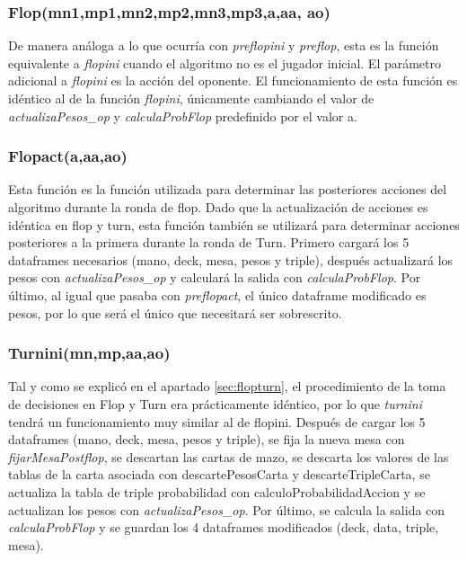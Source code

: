  
\subsubsection{Flop(mn1,mp1,mn2,mp2,mn3,mp3,a,aa, ao)}

De manera análoga a lo que ocurría con  \textit{preflopini} y \textit{ preflop}, esta es la función equivalente a  \textit{flopini} cuando el algoritmo no es el jugador inicial. El parámetro adicional a  \textit{flopini} es la acción del oponente.
El funcionamiento de esta función es idéntico al de la función  \textit{flopini}, únicamente cambiando el valor de \textit{ actualizaPesos\_op} y  \textit{calculaProbFlop} predefinido por el valor a.

\subsubsection{Flopact(a,aa,ao)}

Esta función es la función utilizada para determinar las posteriores acciones del algoritmo durante la ronda de flop. Dado que la actualización de acciones es idéntica en flop y turn, esta función también se utilizará para determinar acciones posteriores a la primera durante la ronda de Turn.
Primero cargará los 5 dataframes necesarios (mano, deck, mesa, pesos y triple), después actualizará los pesos  con  \textit{actualizaPesos\_op} y calculará la salida con  \textit{calculaProbFlop}. Por último, al igual que pasaba con  \textit{preflopact}, el único dataframe modificado es pesos, por lo que será el único que necesitará ser sobrescrito.


\subsubsection{Turnini(mn,mp,aa,ao)}

Tal y como se explicó en el apartado \ref{sec:flopturn}, el procedimiento de la toma de decisiones en Flop y Turn era prácticamente idéntico, por lo que  \textit{turnini} tendrá un funcionamiento muy similar al de flopini.
Después de cargar los 5 dataframes (mano, deck, mesa, pesos y triple), se fija la nueva mesa con  \textit{fijarMesaPostflop}, se descartan las cartas de mazo, se descarta los valores de las tablas de la carta asociada con descartePesosCarta y descarteTripleCarta, se actualiza la tabla de triple probabilidad con calculoProbabilidadAccion y se actualizan los pesos con  \textit{actualizaPesos\_op}.
Por último, se calcula la salida con  \textit{calculaProbFlop} y se guardan los 4 dataframes modificados (deck, data, triple, mesa).


